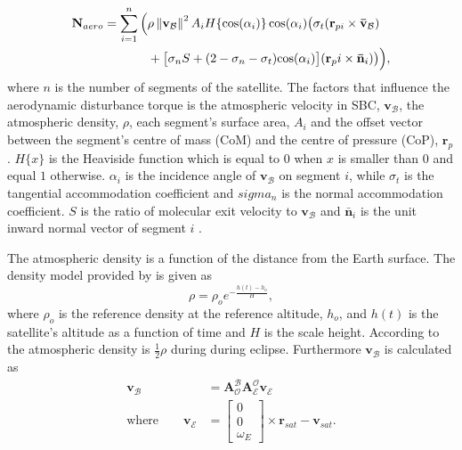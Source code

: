 \begin{equation}
\begin{aligned}
\mathbf{N}_{aero} = \sum_{i=1}^{n}\Big(& \rho \norm{\mathbf{v}_{\mathcal{B}}}^2 A_i H \{\text{cos}(\alpha_i)\} \, \text{cos}(\alpha_i) \big(\sigma_t (\mathbf{r}_{pi} \times \mathbf{\bar{v}}_{\mathcal{B}}) \\
					 & + \big[ \sigma_nS + (2 - \sigma_n - \sigma_t) \text{cos}(\alpha_i)\big] (\mathbf{r}_pi \times \mathbf{\bar{n}}_i) \big) \vphantom{\norm{\mathbf{v}_{\mathcal{B}}}^2}\Big),
\end{aligned}
\end{equation}
where $n$ is the number of segments of the satellite. The factors that influence the aerodynamic disturbance torque is the atmospheric velocity in SBC, $\mathbf{v}_{\mathcal{B}}$, the atmospheric density, $\rho$, each segment's surface area, $A_i$ and the offset vector between the segment's centre of mass (CoM) and the centre of pressure (CoP), $\mathbf{r}_p$. $H\{x\}$ is the Heaviside function which is equal to $0$ when $x$ is smaller than $0$ and equal $1$ otherwise. $\alpha_i$ is the incidence angle of $\mathbf{v}_{\mathcal{B}}$ on segment $i$, while $\sigma_t$ is the tangential accommodation coefficient and $sigma_n$ is the normal accommodation coefficient. $S$ is the ratio of molecular exit velocity to $\mathbf{v}_{\mathcal{B}}$ and $\mathbf{\bar{n}}_i$ is the unit inward normal vector of segment $i$ \cite{JansevanVuuren2015}.

The atmospheric density is a function of the distance from the Earth surface. The density model provided by \cite{vallado2001fundamentals} is given as 
\begin{equation}
\rho = \rho_o e^{-\frac{h(t)-h_o}{H}},
\end{equation}
where $\rho_o$ is the reference density at the reference altitude, $h_o$, and $h(t)$ is the satellite's altitude as a function of time and $H$ is the scale height. According to \cite{steyn2011CubeSat} the atmospheric density is $\frac{1}{2}\rho$ during during eclipse. Furthermore $\mathbf{v}_{\mathcal{B}}$ is calculated as
\begin{equation}
\begin{aligned}
\mathbf{v}_{\mathcal{B}} &= \boldsymbol{A}_{\mathcal{O}}^{\mathcal{B}} \boldsymbol{A}_{\mathcal{E}}^{\mathcal{O}} \mathbf{v}_{\mathcal{E}} \\
\text{where}  \qquad \mathbf{v}_{\mathcal{E}} &= \begin{bmatrix} 0 \\ 0 \\ \omega_E \end{bmatrix} \times \mathbf{r}_{sat} - \mathbf{v}_{sat}.
\end{aligned}
\end{equation}

